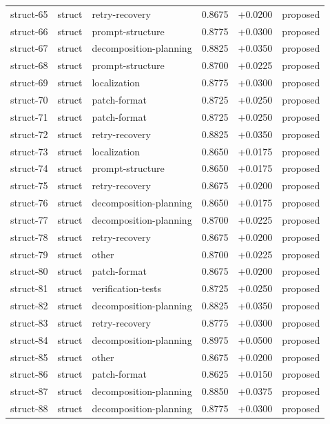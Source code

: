 \begin{center}
\begin{longtable}{llp{5.2cm}rrl}
struct-65 & struct & retry-recovery & 0.8675 & +0.0200 & proposed \\
struct-66 & struct & prompt-structure & 0.8775 & +0.0300 & proposed \\
struct-67 & struct & decomposition-planning & 0.8825 & +0.0350 & proposed \\
struct-68 & struct & prompt-structure & 0.8700 & +0.0225 & proposed \\
struct-69 & struct & localization & 0.8775 & +0.0300 & proposed \\
struct-70 & struct & patch-format & 0.8725 & +0.0250 & proposed \\
struct-71 & struct & patch-format & 0.8725 & +0.0250 & proposed \\
struct-72 & struct & retry-recovery & 0.8825 & +0.0350 & proposed \\
struct-73 & struct & localization & 0.8650 & +0.0175 & proposed \\
struct-74 & struct & prompt-structure & 0.8650 & +0.0175 & proposed \\
struct-75 & struct & retry-recovery & 0.8675 & +0.0200 & proposed \\
struct-76 & struct & decomposition-planning & 0.8650 & +0.0175 & proposed \\
struct-77 & struct & decomposition-planning & 0.8700 & +0.0225 & proposed \\
struct-78 & struct & retry-recovery & 0.8675 & +0.0200 & proposed \\
struct-79 & struct & other & 0.8700 & +0.0225 & proposed \\
struct-80 & struct & patch-format & 0.8675 & +0.0200 & proposed \\
struct-81 & struct & verification-tests & 0.8725 & +0.0250 & proposed \\
struct-82 & struct & decomposition-planning & 0.8825 & +0.0350 & proposed \\
struct-83 & struct & retry-recovery & 0.8775 & +0.0300 & proposed \\
struct-84 & struct & decomposition-planning & 0.8975 & +0.0500 & proposed \\
struct-85 & struct & other & 0.8675 & +0.0200 & proposed \\
struct-86 & struct & patch-format & 0.8625 & +0.0150 & proposed \\
struct-87 & struct & decomposition-planning & 0.8850 & +0.0375 & proposed \\
struct-88 & struct & decomposition-planning & 0.8775 & +0.0300 & proposed \\

\end{longtable}
\end{center}
